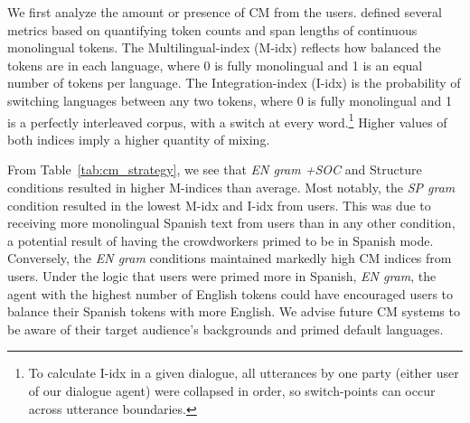 \documentclass[11pt,a4paper]{article}
\newcommand{\ea}[1]{\textcolor{blue}{\bf\small [#1 --EA]}}
\newcommand{\yt}[1]{\textcolor{cyan}{\bf\small [#1 --YT]}}
\newcommand{\tref}[1]{Table~\ref{#1}}
\begin{document}
We first analyze the amount or presence of CM from the users. 
\citet{guzman2017metrics} defined several metrics based on quantifying token counts and span lengths of continuous monolingual tokens.
The Multilingual-index (M-idx) reflects how balanced the tokens are in each language, where 0 is fully monolingual and 1 is an equal number of tokens per language. 
The Integration-index (I-idx) is the probability of switching languages between any two tokens, where 0 is fully monolingual and 1 is a perfectly interleaved corpus, with a switch at every word.\footnote{To calculate I-idx in a given dialogue, all utterances by one party (either user of our dialogue agent) were collapsed in order, so switch-points can occur across utterance boundaries.}
Higher values of both indices imply a higher quantity of mixing. 


From \tref{tab:cm_strategy}, we see that \textit{EN gram +SOC} and Structure conditions resulted in higher M-indices than average. 
Most notably, the \textit{SP gram} condition resulted in the lowest M-idx and I-idx from users.
This was due to receiving more monolingual Spanish text from users than in any other condition, a potential result of having the crowdworkers primed to be in Spanish mode.
Conversely, the \textit{EN gram} conditions maintained markedly high CM indices from users.
Under the logic that users were primed more in Spanish, \textit{EN gram}, the agent with the highest number of English tokens could have encouraged users to balance their Spanish tokens with more English.
We advise future CM systems to be aware of their target audience's backgrounds and primed default languages.



\end{document}
